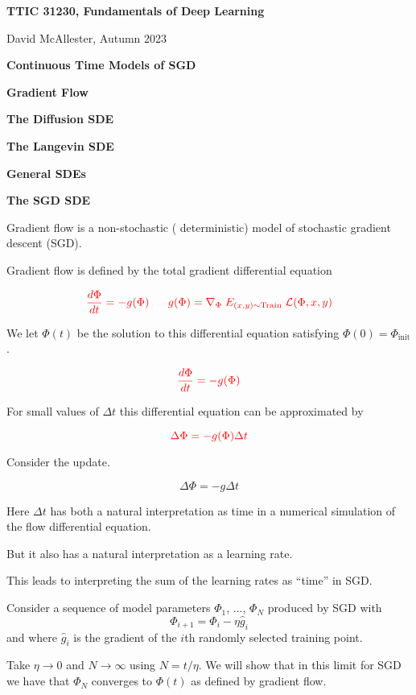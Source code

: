 




{\Huge

\centerline{\bf TTIC 31230, Fundamentals of Deep Learning}
\bigskip
\centerline{David McAllester, Autumn 2023}
\vfill
\centerline{\bf Continuous Time Models of SGD}
\vfill
\vfill
\centerline{\bf Gradient Flow}
\vfill
\centerline{\bf The Diffusion SDE}
\vfill
\centerline{\bf The Langevin SDE}
\vfill
\centerline{\bf General SDEs}
\vfill
\centerline{\bf The SGD SDE}


Gradient flow is a non-stochastic ({\color{red} deterministic}) model of {\color{red} stochastic} gradient descent (SGD).

\vfill
Gradient flow is defined by the {\color{red} total gradient} differential equation

$${\color{red} \frac{d \Phi}{d t} = - g(\Phi) \;\;\;\;\;\; g(\Phi) = \nabla_\Phi\; E_{(x,y) \sim \mathrm{Train}}\;{\cal L}(\Phi,x,y)}$$

\vfill
We let $\Phi(t)$ be the solution to this differential equation satisfying $\Phi(0) = \Phi_{\mathrm{init}}$.

$${\color{red} \frac{d \Phi}{d t} = - g(\Phi)}$$

\vfill
For small values of $\Delta t$ this differential equation can be approximated by

\vfill
$${\color{red} \Delta \Phi = - g(\Phi)\Delta t}$$


Consider the update.


{\color{red} $$\Delta \Phi = - g\Delta t$$}

\vfill
Here $\Delta t$ has both a natural interpretation as time in a numerical simulation of the flow differential equation.

\vfill
But it also has a natural interpretation as a learning rate.

\vfill
This leads to interpreting the sum of the learning rates as ``time'' in SGD.

Consider a sequence of model parameters $\Phi_1$, $\ldots$, $\Phi_N$ produced by SGD with
$$\Phi_{i+1} = \Phi_i - \eta \hat{g}_i$$
and where $\hat{g}_i$ is the gradient of the $i$th randomly selected training point.

\vfill
Take $\eta \rightarrow 0$ and $N \rightarrow \infty$ using $N = t/\eta$.  We will show that in this limit for SGD we have that $\Phi_N$ converges to $\Phi(t)$
as defined by gradient flow.

}
